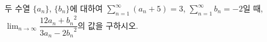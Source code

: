 두 수열 $\{a_n\}$, $\{b_n\}$에 대하여 $\displaystyle\sum_{n=1}^{\infty}(a_n+5)=3$, $\displaystyle\sum_{n=1}^{\infty} b_n=-2$일 때, $\displaystyle\lim_{n\to\infty}\dfrac{12a_n+{b_n}^2}{3a_n-2{b_n}^2}$의 값을 구하시오.
